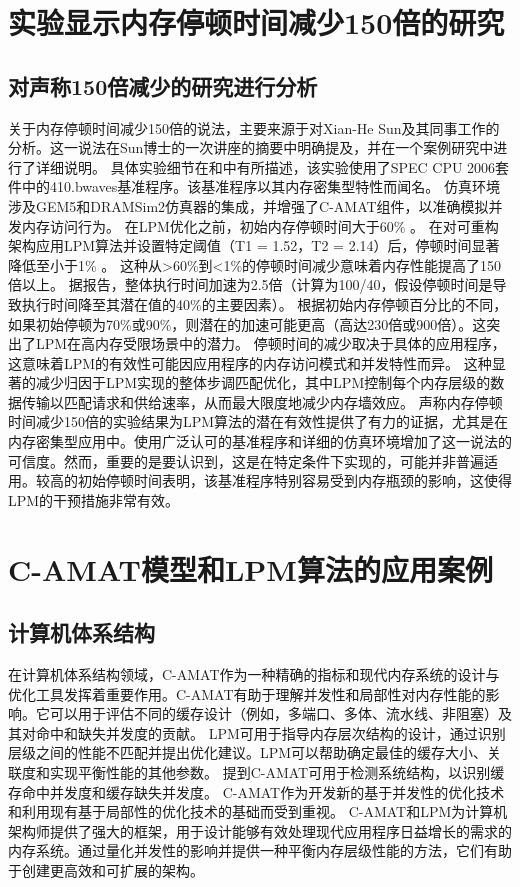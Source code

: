 \documentclass[UTF8]{ctexart}
\begin{document}
\section{实验显示内存停顿时间减少150倍的研究}

\subsection{对声称150倍减少的研究进行分析}
关于内存停顿时间减少150倍的说法，主要来源于对Xian-He Sun及其同事工作的分析\cite{sun2018optimizing}。这一说法在Sun博士的一次讲座的摘要中明确提及\cite{sun2024lectureDGUT}，并在一个案例研究中进行了详细说明\cite{sunMemoryPdf}。
具体实验细节在\cite{sunMemoryPdf}和\cite{sunMemoryPdf}中有所描述，该实验使用了SPEC CPU 2006套件中的410.bwaves基准程序。该基准程序以其内存密集型特性而闻名。
仿真环境涉及GEM5和DRAMSim2仿真器的集成，并增强了C-AMAT组件，以准确模拟并发内存访问行为。
在LPM优化之前，初始内存停顿时间大于60\% \cite{sunMemoryPdf}。
在对可重构架构应用LPM算法并设置特定阈值（T1 = 1.52，T2 = 2.14）后，停顿时间显著降低至小于1\% \cite{sunMemoryPdf}。
这种从>60\%到<1\%的停顿时间减少意味着内存性能提高了150倍以上。
据报告，整体执行时间加速为2.5倍（计算为100/40，假设停顿时间是导致执行时间降至其潜在值的40\%的主要因素）\cite{sunMemoryPdf}。
根据初始内存停顿百分比的不同，如果初始停顿为70\%或90\%，则潜在的加速可能更高（高达230倍或900倍）\cite{sunMemoryPdf}。这突出了LPM在高内存受限场景中的潜力。
停顿时间的减少取决于具体的应用程序\cite{sunMemoryPdf}，这意味着LPM的有效性可能因应用程序的内存访问模式和并发特性而异。
这种显著的减少归因于LPM实现的整体步调匹配优化，其中LPM控制每个内存层级的数据传输以匹配请求和供给速率，从而最大限度地减少内存墙效应\cite{sunMemoryPdf}。
声称内存停顿时间减少150倍的实验结果为LPM算法的潜在有效性提供了有力的证据，尤其是在内存密集型应用中。使用广泛认可的基准程序和详细的仿真环境增加了这一说法的可信度。然而，重要的是要认识到，这是在特定条件下实现的，可能并非普遍适用。较高的初始停顿时间表明，该基准程序特别容易受到内存瓶颈的影响，这使得LPM的干预措施非常有效。

\section{C-AMAT模型和LPM算法的应用案例}

\subsection{计算机体系结构}
在计算机体系结构领域，C-AMAT作为一种精确的指标和现代内存系统的设计与优化工具发挥着重要作用\cite{sunCAMATPage}。C-AMAT有助于理解并发性和局部性对内存性能的影响。它可以用于评估不同的缓存设计（例如，多端口、多体、流水线、非阻塞）及其对命中和缺失并发度的贡献\cite{illustrationCAMATPureMiss}。
LPM可用于指导内存层次结构的设计，通过识别层级之间的性能不匹配并提出优化建议\cite{sun2018optimizing}。LPM可以帮助确定最佳的缓存大小、关联度和实现平衡性能的其他参数。
\cite{sun2018optimizing}提到C-AMAT可用于检测系统结构，以识别缓存命中并发度和缓存缺失并发度。
C-AMAT作为开发新的基于并发性的优化技术和利用现有基于局部性的优化技术的基础而受到重视\cite{sun2018optimizing}。
C-AMAT和LPM为计算机架构师提供了强大的框架，用于设计能够有效处理现代应用程序日益增长的需求的内存系统。通过量化并发性的影响并提供一种平衡内存层级性能的方法，它们有助于创建更高效和可扩展的架构。
\end{document}
